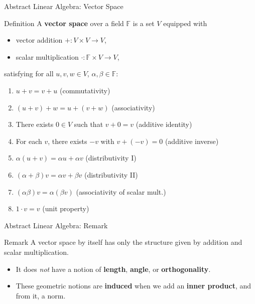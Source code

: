 \blueheader
\begin{frame}{Abstract Linear Algebra: Vector Space}
\begin{blue*}{Definition}
A \textbf{vector space} over a field $\mathbb{F}$ is a set $V$ equipped with
\begin{itemize}
    \item vector addition $+: V \times V \to V$,
    \item scalar multiplication $\cdot: \mathbb{F} \times V \to V$,
\end{itemize}
satisfying for all $u,v,w \in V$, $\alpha,\beta \in \mathbb{F}$:
\begin{enumerate}
    \item $u+v = v+u$ \hfill (commutativity)
    \item $(u+v)+w = u+(v+w)$ \hfill (associativity)
    \item There exists $0 \in V$ such that $v+0=v$ \hfill (additive identity)
    \item For each $v$, there exists $-v$ with $v+(-v)=0$ \hfill (additive inverse)
    \item $\alpha(u+v) = \alpha u + \alpha v$ \hfill (distributivity I)
    \item $(\alpha+\beta) v = \alpha v + \beta v$ \hfill (distributivity II)
    \item $(\alpha\beta)v = \alpha(\beta v)$ \hfill (associativity of scalar mult.)
    \item $1 \cdot v = v$ \hfill (unit property)
\end{enumerate}
\end{blue*}
\end{frame}

\redheader
\begin{frame}{Abstract Linear Algebra: Remark}
\begin{red*}{Remark}
A vector space by itself has only the structure given by addition and scalar multiplication.  
\medskip

\begin{itemize}
    \item It does \emph{not} have a notion of \textbf{length}, \textbf{angle}, or \textbf{orthogonality}.
    \item These geometric notions are \textbf{induced} when we add an \textbf{inner product}, and from it, a norm.
\end{itemize}
\end{red*}
\end{frame}

